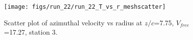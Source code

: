\begin{figure}[H]
\centering
\texttt{[image: figs/run\_22/run\_22\_T\_vs\_r\_meshscatter]}
\caption{Scatter plot of azimuthal velocity vs radius at $z/c$=7.75, $V_{free}$=17.27, station 3.}
\label{fig:run_22_T_vs_r_meshscatter}
\end{figure}


